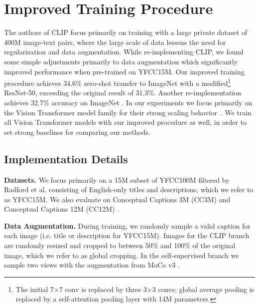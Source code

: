 \documentclass[10pt,twocolumn,letterpaper]{article}
\renewcommand{\paragraph}[1]{\vspace{1.25mm}\noindent\textbf{#1}}
\begin{document}
\section{Improved Training Procedure}

The authors of CLIP focus primarily on training with a large private dataset of 400M image-text pairs, where the large scale of data lessens the need for regularization and data augmentation.
While re-implementing CLIP, we found some simple adjustments primarily to data augmentation which significantly improved performance when pre-trained on YFCC15M.
Our improved training procedure achieves 34.6\% zero-shot transfer to ImageNet with a modified\footnote{The initial 7$\times$7 conv is replaced by three 3$\times$3 convs; global average pooling is replaced by a self-attention pooling layer with 14M parameters.} ResNet-50, exceeding the original result of 31.3\%.
Another re-implementation achieves 32.7\% accuracy on ImageNet \cite{ilharco_gabriel_2021_5143773}.
In our experiments we focus primarily on the Vision Transformer model family for their strong scaling behavior~\cite{Dosovitskiy2021AnII}. We train all Vision Transformer models with our improved procedure as well, in order to set strong baselines for comparing our methods.

\subsection{Implementation Details}
\label{sec:implementation}

\paragraph{Datasets.} We focus primarily on a 15M subset of YFCC100M \cite{Thomee2016YFCC100MTN} filtered by Radford et al. \cite{Radford2021LearningTV} consisting of English-only titles and descriptions, which we refer to as YFCC15M.
We also evaluate on Conceptual Captions 3M (CC3M) \cite{Sharma2018ConceptualCA} and Conceptual Captions 12M (CC12M) \cite{Changpinyo2021Conceptual1P}.

\paragraph{Data Augmentation.} During training, we randomly sample a valid caption for each image (i.e. title or description for YFCC15M).
Images for the CLIP branch are randomly resized and cropped to between 50\% and 100\% of the original image, which we refer to as global cropping.
In the self-supervised branch we sample two views with the augmentation from MoCo v3 \cite{Chen2020ASF}.
\end{document}
